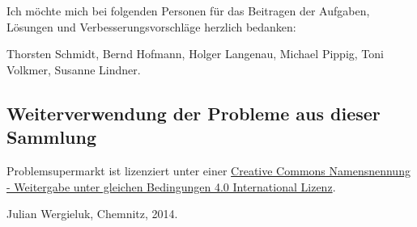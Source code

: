 Ich möchte mich bei folgenden Personen für das Beitragen der Aufgaben, Lösungen und
Verbesserungsvorschläge herzlich bedanken: 

Thorsten Schmidt, Bernd Hofmann, Holger Langenau, Michael Pippig, Toni Volkmer,
Susanne Lindner.

\subsection*{Weiterverwendung der Probleme aus dieser Sammlung}

Problemsupermarkt ist lizenziert unter einer
\href{http://creativecommons.org/licenses/by-sa/4.0/}{Creative Commons
Namensnennung - Weitergabe unter gleichen Bedingungen 4.0 International
Lizenz}.

\begin{flushright}
Julian Wergieluk, Chemnitz, 2014.
\end{flushright}


